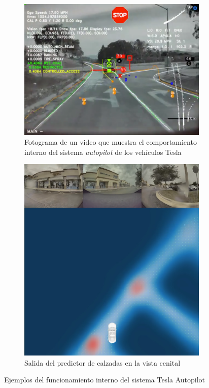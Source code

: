 \begin{figure}[h!]
    \begin{subfigure}[c]{.5\textwidth}
      \centering
      \includegraphics[width=.8\linewidth]{img/teslaautopilotOverlays.png}
      \caption{Fotograma de un video que muestra el comportamiento interno del sistema \textit{autopilot} de los vehículos Tesla}
      \label{fig:teslaautopilotvideorecruit}
    \end{subfigure}%
    \begin{subfigure}[c]{.5\textwidth}
      \centering
      \includegraphics[width=.8\linewidth]{img/teslaTopDown.png}
      \caption{Salida del predictor de calzadas en la vista cenital}
      \label{fig:preditorCalzadasTesla}
    \end{subfigure}
    
    \caption{Ejemplos del funcionamiento interno del sistema Tesla Autopilot}
    \label{fig:ejemploTesla}
\end{figure}

